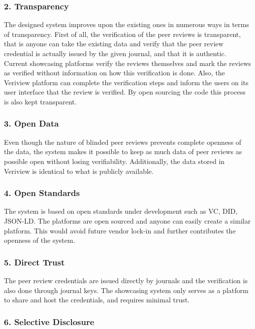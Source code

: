 \subsubsection{2. Transparency}

The designed system improves upon the existing ones in numerous ways in terms of transparency. First of all, the verification of the peer reviews is transparent, that is anyone can take the existing data and verify that the peer review credential is actually issued by the given journal, and that it is authentic. Current showcasing platforms verify the reviews themselves and mark the reviews as verified without information on how this verification is done. Also, the Veriview platform can complete the verification steps and inform the users on its user interface that the review is verified. By open sourcing the code this process is also kept transparent.

\subsubsection{3. Open Data}

Even though the nature of blinded peer reviews prevents complete openness of the data, the system makes it possible to keep as much data of peer reviews as possible open without losing verifiability. Additionally, the data stored in Veriview is identical to what is publicly available. 

\subsubsection{4. Open Standards}

The system is based on open standards under development such as \acrlong{VC}, \acrlong{DID}, \acrshort{JSON-LD}. The platforms are open sourced and anyone can easily create a similar platform. This would avoid future vendor lock-in and further contributes the openness of the system.

\subsubsection{5. Direct Trust}

The peer review credentials are issued directly by journals and the verification is also done through journal keys. The showcasing system only serves as a platform to share and host the credentials, and requires minimal trust. 

\subsubsection{6. Selective Disclosure}

